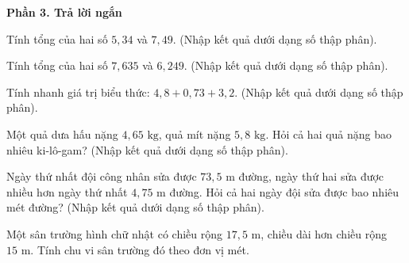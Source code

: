 \textbf{Phần 3. Trả lời ngắn}

\begin{ex} %
Tính tổng của hai số $5{,}34$ và $7{,}49$. (Nhập kết quả dưới dạng số thập phân).
\end{ex}

\begin{ex} %
Tính tổng của hai số $7{,}635$ và $6{,}249$. (Nhập kết quả dưới dạng số thập phân).
\end{ex}

\begin{ex} %
Tính nhanh giá trị biểu thức: $4{,}8 + 0{,}73 + 3{,}2$. (Nhập kết quả dưới dạng số thập phân).
\end{ex}

\begin{ex} %
Một quả dưa hấu nặng $4{,}65\text{ kg}$, quả mít nặng $5{,}8\text{ kg}$. Hỏi cả hai quả nặng bao nhiêu ki-lô-gam? (Nhập kết quả dưới dạng số thập phân).
\end{ex}

\begin{ex} %
Ngày thứ nhất đội công nhân sửa được $73{,}5\text{ m}$ đường, ngày thứ hai sửa được nhiều hơn ngày thứ nhất $4{,}75\text{ m}$ đường. Hỏi cả hai ngày đội sửa được bao nhiêu mét đường? (Nhập kết quả dưới dạng số thập phân).
\end{ex}

\begin{ex} %
Một sân trường hình chữ nhật có chiều rộng $17{,}5\text{ m}$, chiều dài hơn chiều rộng $15\text{ m}$. Tính chu vi sân trường đó theo đơn vị mét.
\end{ex}
